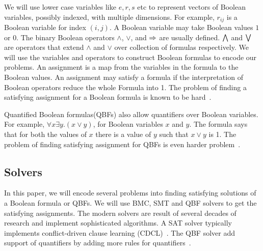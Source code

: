 We will use lower case variables like $e,r,s$ etc to represent vectors of
Boolean variables, possibly indexed, with multiple dimensions.
%
For example, $r_{ij}$ is a Boolean variable for index $(i,j)$.
%
%
A Boolean variable may take Boolean values $1$ or $0$.
%
The binary Boolean operators $\land$, $\lor$, and $\Rightarrow$ are usually defined.
%
$\bigwedge$ and $\bigvee$ are operators that extend $\land$ and $\lor$ over
collection of formulas respectively.
%
We will use the variables and operators to construct Boolean formulas to
encode our problems.
%
An assignment is a map from the variables in the formula to the Boolean values.
%
An assignment may satisfy a formula if the interpretation of Boolean operators
reduce the whole Formula into 1.
%
The problem of finding a satisfying assignment for a Boolean formula is known to be hard~\cite{cook1971complexity}.
%

Quantified Boolean formulas(QBFs) also allow quantifiers over Boolean variables.
%
For example, $\forall x \exists y. (x \lor y)$, for Boolean variables $x$ and $y$.
%
The formula says that for both the values of $x$ there is a value of $y$
such that $x \lor y$ is 1.
%
The problem of finding satisfying assignment for QBFs is even harder problem~\cite{arora2009computational}.
%

\subsection{Solvers}
In this paper, we will encode several problems into finding satisfying
solutions of a Boolean formula or QBFs.
%
We will use BMC, SMT and QBF solvers to get the satisfying assignments.
%
The modern solvers are result of several decades of research
and implement sophisticated algorithms.
%
A SAT solver typically implements conflict-driven clause learning (CDCL)~\cite{biere2009conflict}.
The QBF solver add support of quantifiers by adding more rules for quantifiers~\cite{buning2009theory}.

%
%

